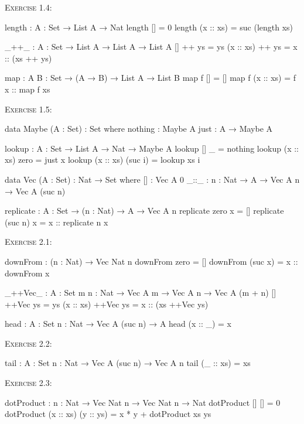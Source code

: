 \documentclass{article}
\begin{document}
\noindent
\textsc{Exercise 1.4}:

\begin{code}
length : {A : Set} → List A → Nat
length [] = 0
length (x :: xs) = suc (length xs)

_++_ : {A : Set} → List A → List A → List A
[] ++ ys = ys
(x :: xs) ++ ys = x :: (xs ++ ys)

map : {A B : Set} → (A → B) → List A → List B
map f [] = []
map f (x :: xs) = f x :: map f xs
\end{code}

\noindent
\textsc{Exercise 1.5}:

\begin{code}
data Maybe (A : Set) : Set where
    nothing : Maybe A
    just : A → Maybe A

lookup : {A : Set} → List A → Nat → Maybe A
lookup [] _ = nothing
lookup (x :: xs) zero = just x
lookup (x :: xs) (suc i) = lookup xs i
\end{code}

\begin{code}
data Vec (A : Set) : Nat → Set where
    [] : Vec A 0
    _::_ : {n : Nat} → A → Vec A n → Vec A (suc n)

replicate : {A : Set} → (n : Nat) → A → Vec A n
replicate zero x = []
replicate (suc n) x = x :: replicate n x
\end{code}

\noindent
\textsc{Exercise 2.1}:

\begin{code}
downFrom : (n : Nat) → Vec Nat n
downFrom zero = []
downFrom (suc x) = x :: downFrom x
\end{code}

\begin{code}
_++Vec_ : {A : Set} {m n : Nat}
    → Vec A m → Vec A n → Vec A (m + n)
[] ++Vec ys = ys
(x :: xs) ++Vec ys = x :: (xs ++Vec ys)

head : {A : Set} {n : Nat} → Vec A (suc n) → A
head (x :: _) = x
\end{code}

\noindent
\textsc{Exercise 2.2}:

\begin{code}
tail : {A : Set} {n : Nat} → Vec A (suc n) → Vec A n
tail (_ :: xs) = xs
\end{code}

\noindent
\textsc{Exercise 2.3}:

\begin{code}
dotProduct : {n : Nat} → Vec Nat n → Vec Nat n → Nat
dotProduct [] [] = 0
dotProduct (x :: xs) (y :: ys) = x * y + dotProduct xs ys
\end{code}
\end{document}
